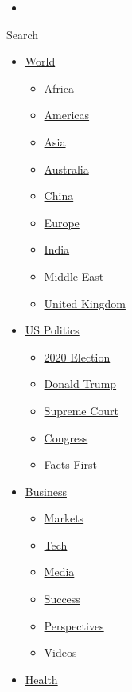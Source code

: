 \begin{itemize}
\item
\end{itemize}

Search

\begin{itemize}
\tightlist
\item
  \href{/world}{World}

  \begin{itemize}
  \tightlist
  \item
    \href{/africa}{Africa}
  \item
    \href{/americas}{Americas}
  \item
    \href{/asia}{Asia}
  \item
    \href{/australia}{Australia}
  \item
    \href{/china}{China}
  \item
    \href{/europe}{Europe}
  \item
    \href{/india}{India}
  \item
    \href{/middle-east}{Middle East}
  \item
    \href{/uk}{United Kingdom}
  \end{itemize}
\item
  \href{/politics}{US Politics}

  \begin{itemize}
  \tightlist
  \item
    \href{/election/2020}{2020 Election}
  \item
    \href{/specials/politics/president-donald-trump-45}{Donald Trump}
  \item
    \href{/specials/politics/supreme-court-nine}{Supreme Court}
  \item
    \href{/specials/politics/congress}{Congress}
  \item
    \href{/specials/politics/fact-check-politics}{Facts First}
  \end{itemize}
\item
  \href{/business}{Business}

  \begin{itemize}
  \tightlist
  \item
    \href{https://money.cnn.com/data/markets/}{Markets}
  \item
    \href{/business/tech}{Tech}
  \item
    \href{/business/media}{Media}
  \item
    \href{/business/success}{Success}
  \item
    \href{/business/perspectives}{Perspectives}
  \item
    \href{/business/videos}{Videos}
  \end{itemize}
\item
  \href{/health}{Health}


\end{itemize}
